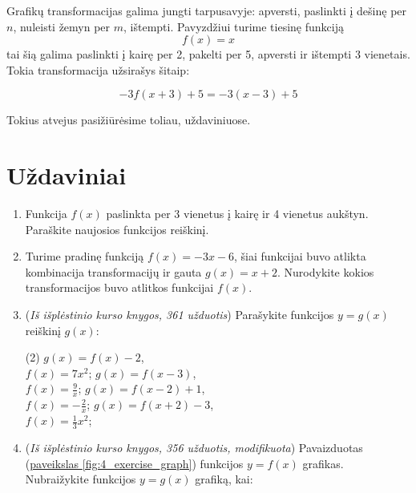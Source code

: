 \documentclass{tufte-handout}
\begin{document}
Grafikų transformacijas galima jungti tarpusavyje: apversti, paslinkti į dešinę
per $n$, nuleisti žemyn per $m$, ištempti. Pavyzdžiui turime tiesinę funkciją
$$f(x)=x$$
tai šią galima paslinkti į kairę per 2, pakelti per 5, apversti ir
ištempti 3 vienetais. Tokia transformacija užsirašys šitaip:

$$-3f(x+3)+5=-3(x-3)+5$$

Tokius atvejus pasižiūrėsime toliau, uždaviniuose.
\section{Uždaviniai}\label{sec:exercises}

\begin{enumerate}
  \item Funkcija $f(x)$ paslinkta per 3 vienetus į kairę ir 4 vienetus aukštyn.
        Paraškite naujosios funkcijos reiškinį.
  \item Turime pradinę funkciją $f(x)=-3x-6$, šiai funkcijai buvo atlikta
        kombinacija transformacijų ir gauta $g(x)=x+2$. Nurodykite kokios
        transformacijos buvo atlitkos funkcijai $f(x)$.
  \item (\textit{Iš išplėstinio kurso knygos, 361 užduotis}) Parašykite
        funkcijos $y=g(x)$ reiškinį $g(x)$:

        \begin{tasks}[item-format={\normalfont}, after-item-skip=2mm](2)
          \task $g(x)=f(x)-2$,\\ $f(x)=7x^2$;
          \task $g(x)=f(x-3)$,\\  $f(x)=\frac{9}{x}$;
          \task $g(x)=f(x-2)+1$,\\  $f(x)=-\frac{2}{x}$;
          \task $g(x)=f(x+2)-3$,\\ $f(x)=\frac{1}{3}x^2$;
        \end{tasks}

  \item (\textit{Iš išplėstinio kurso knygos, 356 užduotis, modifikuota})
        Pavaizduotas
        (\hyperref[fig:4_exercise_graph]{paveikslas
          \ref*{fig:4_exercise_graph}})
        funkcijos $y=f(x)$ grafikas. Nubraižykite funkcijos $y=g(x)$ grafiką,
        kai:

        \begin{marginfigure}%


\end{marginfigure}
\end{enumerate}
\end{document}
